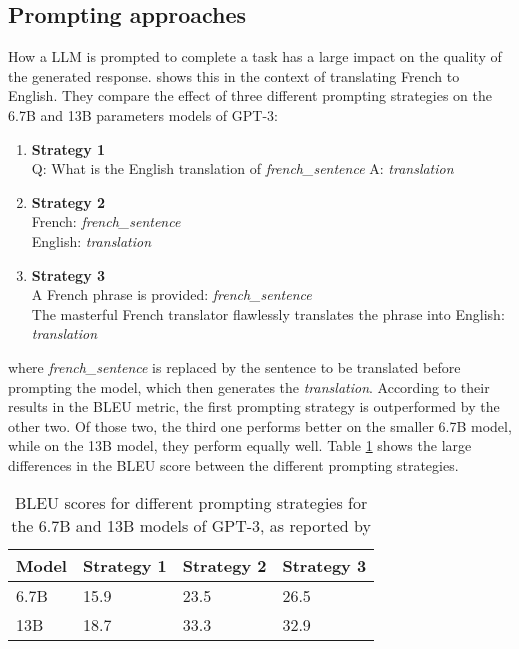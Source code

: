\subsection{Prompting approaches}\label{sec:prompting-approaches}
How a LLM is prompted to complete a task has a large impact on the quality of the generated response.
\cite{reynolds:2021} shows this in the context of translating French to English.
They compare the effect of three different prompting strategies on the 6.7B and 13B parameters models of GPT-3:
\begin{enumerate}
    \item \textbf{Strategy 1}\\Q: What is the English translation of \textit{french\_sentence} A: \textit{translation}
    \item \textbf{Strategy 2}\\French: \textit{french\_sentence}\\English: \textit{translation}
    \item \textbf{Strategy 3}\\A French phrase is provided: \textit{french\_sentence}\\
    The masterful French translator flawlessly translates the phrase
into English: \textit{translation}
\end{enumerate}
where \textit{french\_sentence} is replaced by the sentence to be translated before prompting the model, which then generates the \textit{translation}.
According to their results in the BLEU metric, the first prompting strategy is outperformed by the other two.
Of those two, the third one performs better on the smaller 6.7B model, while on the 13B model, they perform equally well.
Table \ref{tab:fr-en-prompting} shows the large differences in the BLEU score between the different prompting strategies.
\begin{table}[tb]
\centering
\begin{tabularx}{\textwidth}{lXXX}
\hline
\textbf{Model} & \textbf{Strategy 1} & \textbf{Strategy 2} & \textbf{Strategy 3} \\
\hline
6.7B & 15.9 & 23.5 & 26.5 \\
13B & 18.7 & 33.3 & 32.9 \\
\hline
\end{tabularx}
\caption{BLEU scores for different prompting strategies for the 6.7B and 13B models of GPT-3, as reported by \cite{reynolds:2021}}\label{tab:fr-en-prompting}
\end{table}
\\
